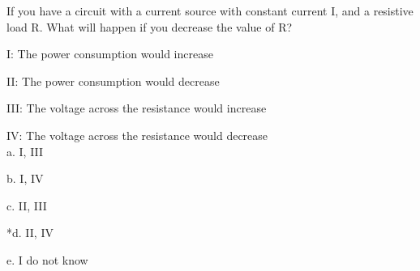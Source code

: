 
If you have a circuit with a current source with constant current I, and a resistive load R. What will happen if you decrease the value of R? 

I: The power consumption would increase

II: The power consumption would decrease

III: The voltage across the resistance would increase

IV: The voltage across the resistance would decrease \\

a. I, III

b. I, IV

c. II, III

*d. II, IV

e. I do not know \\

